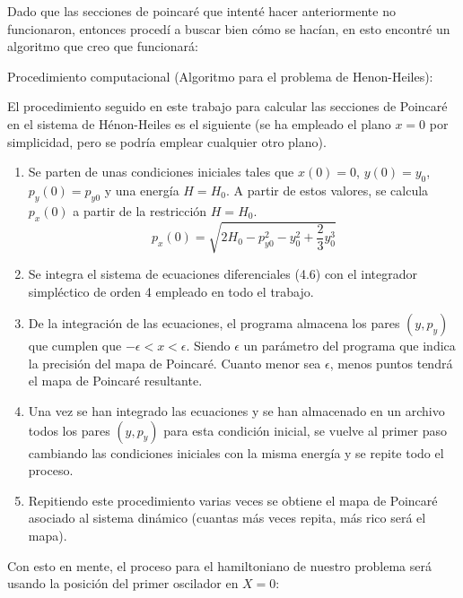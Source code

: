 \documentclass[idxtotoc,hyperref,openany]{labbook} %
\begin{document}
Dado que las secciones de poincaré que intenté hacer anteriormente no funcionaron, entonces procedí a buscar bien cómo se hacían, en esto encontré un algoritmo que creo que funcionará:

Procedimiento computacional (Algoritmo para el problema de Henon-Heiles):


El procedimiento seguido en este trabajo para calcular las secciones de Poincaré en el sistema de Hénon-Heiles es el siguiente (se ha empleado el plano $x = 0$ por simplicidad, pero se podría emplear cualquier otro plano).

\begin{enumerate}
\item Se parten de unas condiciones iniciales tales que $x(0) = 0$, $y(0) = y_0$, $p_y(0) = p_{y0}$ y una energía $H = H_0$. A partir de estos valores, se calcula $p_x(0)$ a partir de la restricción $H = H_0$.
\begin{equation}
p_x(0)=\sqrt{2H_0-p_{y0}^2-y_0^2+\frac{2}{3}y_0^3}
\end{equation}
\item Se integra el sistema de ecuaciones diferenciales (4.6) con el integrador simpléctico de orden 4 empleado en todo el trabajo.

\item De la integración de las ecuaciones, el programa almacena los pares $(y,p_y)$ que cumplen que $−\epsilon < x < \epsilon$. Siendo $\epsilon$ un parámetro del programa que indica la precisión del mapa de Poincaré. Cuanto menor sea $\epsilon$, menos puntos tendrá el mapa de Poincaré resultante.

\item Una vez se han integrado las ecuaciones y se han almacenado en un archivo todos los pares $(y,p_y)$ para esta condición inicial, se vuelve al primer paso cambiando las condiciones iniciales con la misma energía y se repite todo el proceso.

\item Repitiendo este procedimiento varias veces se obtiene el mapa de Poincaré asociado al sistema dinámico (cuantas más veces repita, más rico será el mapa).

\end{enumerate}

Con esto en mente, el proceso para el hamiltoniano de nuestro problema será usando la posición del primer oscilador en $X=0$:
\end{document}
